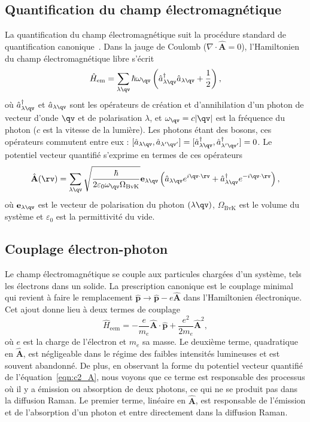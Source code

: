 \subsection{Quantification du champ électromagnétique}

La quantification du champ électromagnétique suit la procédure standard de quantification canonique~\cite{hegerfeldtPhotonsAtomsIntroduction1990}. Dans la jauge de Coulomb ($\nabla\cdot\hat{\mathbf{A}}=0$), l'Hamiltonien du champ électromagnétique libre s'écrit
\begin{equation}
    \hat{H}_\text{em} = \sum_{\lambda\qv}\hbar\omega_{\qv}\left(\hat{a}_{\lambda\qv}^\dag\hat{a}_{\lambda\qv}+\frac{1}{2}\right),
\end{equation}
où $\hat{a}^\dag_{\lambda\qv}$ et $\hat{a}_{\lambda\qv}$ sont les opérateurs de création et d'annihilation d'un photon de vecteur d'onde $\qv$ et de polarisation $\lambda$, et $\omega_\qv=c|\qv|$ est la fréquence du photon ($c$ est la vitesse de la lumière). Les photons étant des bosons, ces opérateurs commutent entre eux : $[\hat{a}_{\lambda\qv},\hat{a}_{\lambda'\qv'}]=[\hat{a}_{\lambda\qv}^\dag,\hat{a}^\dag_{\lambda'\qv'}] = 0$. Le potentiel vecteur quantifié s'exprime en termes de ces opérateurs
\begin{equation}
    \hat{\mathbf{A}}(\rv)=\sum_{\lambda\qv}\sqrt{\frac{\hbar}{2\varepsilon_0\omega_\qv \Omega_\text{BvK}}}\mathbf{e}_{\lambda\qv}\left(\hat{a}_{\lambda\qv}e^{i\qv\cdot\rv}+\hat{a}^\dag_{\lambda\qv}e^{-i\qv\cdot\rv}\right),
    \label{eqn:c2_A}
\end{equation}
où $\mathbf{e}_{\lambda\qv}$ est le vecteur de polarisation du photon $(\lambda\qv)$, $\Omega_\text{BvK}$ est le volume du système et $\varepsilon_0$ est la permittivité du vide. 

\subsection{Couplage électron-photon}

Le champ électromagnétique se couple aux particules chargées d'un système, tels les électrons dans un solide. La prescription canonique est le couplage minimal qui revient à faire le remplacement $\hat{\mathbf{p}}\rightarrow \hat{\mathbf{p}}-e\hat{\mathbf{A}}$ dans l'Hamiltonien électronique. Cet ajout donne lieu à deux termes de couplage
\begin{equation}
    \hat{H}_\text{eem}=-\frac{e}{m_e}\hat{\mathbf{A}}\cdot\hat{\mathbf{p}}+\frac{e^2}{2m_e}\hat{\mathbf{A}}^2,
\end{equation}
où $e$ est la charge de l'électron et $m_e$ sa masse. Le deuxième terme, quadratique en $\hat{\mathbf{A}}$, est négligeable dans le régime des faibles intensités lumineuses et est souvent abandonné. De plus, en observant la forme du potentiel vecteur quantifié de l'équation~\eqref{eqn:c2_A}, nous voyons que ce terme est responsable des processus où il y a émission ou absorption de deux photons, ce qui ne se produit pas dans la diffusion Raman. Le premier terme, linéaire en $\hat{\mathbf{A}}$, est responsable de l'émission et de l'absorption d'un photon et entre directement dans la diffusion Raman.

